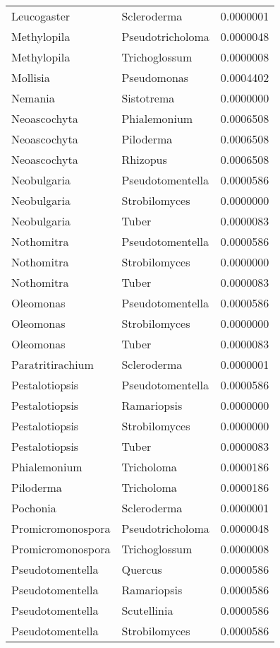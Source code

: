 \documentclass[border=1mm]{standalone}
\begin{document}
\begin{longtable}[t]{lll}
Leucogaster & Scleroderma & 0.0000001\\
\addlinespace
Methylopila & Pseudotricholoma & 0.0000048\\
Methylopila & Trichoglossum & 0.0000008\\
Mollisia & Pseudomonas & 0.0004402\\
Nemania & Sistotrema & 0.0000000\\
Neoascochyta & Phialemonium & 0.0006508\\
\addlinespace
Neoascochyta & Piloderma & 0.0006508\\
Neoascochyta & Rhizopus & 0.0006508\\
Neobulgaria & Pseudotomentella & 0.0000586\\
Neobulgaria & Strobilomyces & 0.0000000\\
Neobulgaria & Tuber & 0.0000083\\
\addlinespace
Nothomitra & Pseudotomentella & 0.0000586\\
Nothomitra & Strobilomyces & 0.0000000\\
Nothomitra & Tuber & 0.0000083\\
Oleomonas & Pseudotomentella & 0.0000586\\
Oleomonas & Strobilomyces & 0.0000000\\
\addlinespace
Oleomonas & Tuber & 0.0000083\\
Paratritirachium & Scleroderma & 0.0000001\\
Pestalotiopsis & Pseudotomentella & 0.0000586\\
Pestalotiopsis & Ramariopsis & 0.0000000\\
Pestalotiopsis & Strobilomyces & 0.0000000\\
\addlinespace
Pestalotiopsis & Tuber & 0.0000083\\
Phialemonium & Tricholoma & 0.0000186\\
Piloderma & Tricholoma & 0.0000186\\
Pochonia & Scleroderma & 0.0000001\\
Promicromonospora & Pseudotricholoma & 0.0000048\\
\addlinespace
Promicromonospora & Trichoglossum & 0.0000008\\
Pseudotomentella & Quercus & 0.0000586\\
Pseudotomentella & Ramariopsis & 0.0000586\\
Pseudotomentella & Scutellinia & 0.0000586\\
Pseudotomentella & Strobilomyces & 0.0000586\\

\end{longtable}
\end{document}
